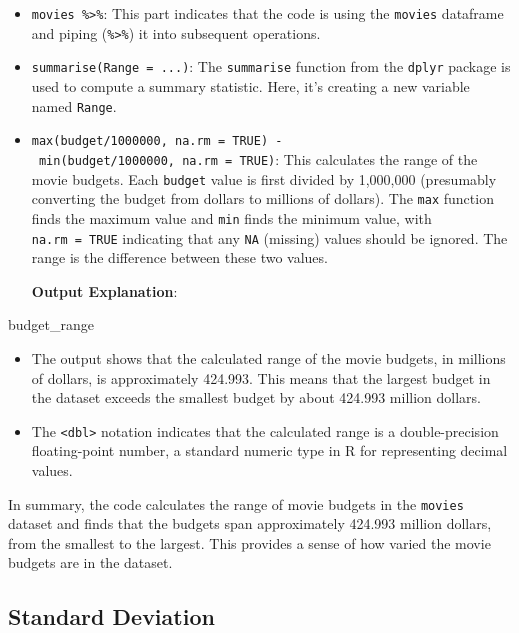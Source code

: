 \documentclass[
]{book}
\newenvironment{Shaded}{\begin{snugshade}}{\end{snugshade}}
\newcommand{\NormalTok}[1]{#1}
\providecommand{\tightlist}{%
  \setlength{\itemsep}{0pt}\setlength{\parskip}{0pt}}
\begin{document}
\begin{itemize}
\item
  \texttt{movies\ \%\textgreater{}\%}: This part indicates that the code is using the \texttt{movies} dataframe and piping (\texttt{\%\textgreater{}\%}) it into subsequent operations.
\item
  \texttt{summarise(Range\ =\ ...)}: The \texttt{summarise} function from the \texttt{dplyr} package is used to compute a summary statistic. Here, it's creating a new variable named \texttt{Range}.
\item
  \texttt{max(budget/1000000,\ na.rm\ =\ TRUE)\ -\ min(budget/1000000,\ na.rm\ =\ TRUE)}: This calculates the range of the movie budgets. Each \texttt{budget} value is first divided by 1,000,000 (presumably converting the budget from dollars to millions of dollars). The \texttt{max} function finds the maximum value and \texttt{min} finds the minimum value, with \texttt{na.rm\ =\ TRUE} indicating that any \texttt{NA} (missing) values should be ignored. The range is the difference between these two values.

  \textbf{Output Explanation}:
\end{itemize}

\begin{Shaded}
\begin{Highlighting}[]
\NormalTok{budget\_range}
\end{Highlighting}
\end{Shaded}

\begin{itemize}
\tightlist
\item
  The output shows that the calculated range of the movie budgets, in millions of dollars, is approximately 424.993. This means that the largest budget in the dataset exceeds the smallest budget by about 424.993 million dollars.
\item
  The \texttt{\textless{}dbl\textgreater{}} notation indicates that the calculated range is a double-precision floating-point number, a standard numeric type in R for representing decimal values.
\end{itemize}

In summary, the code calculates the range of movie budgets in the \texttt{movies} dataset and finds that the budgets span approximately 424.993 million dollars, from the smallest to the largest. This provides a sense of how varied the movie budgets are in the dataset.

\subsection*{Standard Deviation}\label{standard-deviation}
\end{document}
